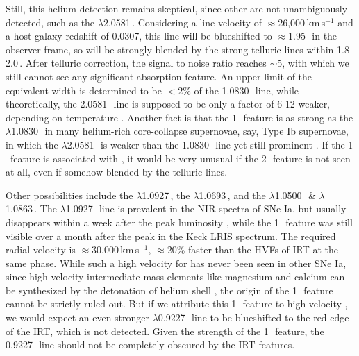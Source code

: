 \documentclass[twocolumn]{aastex631}
\begin{document}
Still, this helium detection remains skeptical, since other  are not unambiguously detected, such as the  $\lambda$2.0581\,\micron. Considering a line velocity of $\approx$26,000\,km\,s$^{-1}$ and a host galaxy redshift of 0.0307, this line will be blueshifted to $\approx$1.95\,\micron\ in the observer frame, so will be strongly blended by the strong telluric lines within 1.8-2.0\,\micron. After telluric correction, the signal to noise ratio reaches $\sim$5, with which we still cannot see any significant absorption feature. An upper limit of the equivalent width is determined to be $<2\%$ of the 1.0830\,\micron\ line, while theoretically, the 2.0581\,\micron\ line is supposed to be only a factor of 6-12 weaker, depending on temperature \citep{Marion2009_NIR}. Another fact is that the 1\,\micron\ feature is as strong as the  $\lambda$1.0830\,\micron\ in many helium-rich core-collapse supernovae, say, Type Ib supernovae, in which the  $\lambda$2.0581\,\micron\ is weaker than the 1.0830\,\micron\ line yet still prominent \citep{CSP_Ibc_2022}. If the 1\,\micron\ feature is associated with , it would be very unusual if the 2\,\micron\ feature is not seen at all, even if somehow blended by the telluric lines.

Other possibilities include the  $\lambda$1.0927\,\micron, the  $\lambda$1.0693\,\micron, and the  $\lambda$1.0500\,\micron\ \& $\lambda$1.0863\,\micron. The  $\lambda$1.0927\,\micron\ line is prevalent in the NIR spectra of SNe Ia, but usually disappears within a week after the peak luminosity \citep{Marion2009_NIR}, while the 1\,\micron\ feature was still visible over a month after the peak in the Keck LRIS spectrum. The required radial velocity is $\approx$30,000\,km\,s$^{-1}$, $\approx$20\% faster than the HVFs of  IRT at the same phase. While such a high velocity for  has never been seen in other SNe Ia, since high-velocity intermediate-mass elements like magnesium and calcium can be synthesized by the detonation of helium shell \citep{Shen_DD_2014}, the  origin of the 1\,\micron\ feature cannot be strictly ruled out. But if we attribute this 1\,\micron\ feature to high-velocity , we would expect an even stronger $\lambda$0.9227\,\micron\ line to be blueshifted to the red edge of the  IRT, which is not detected. Given the strength of the 1\,\micron\ feature, the 0.9227\,\micron\ line should not be completely obscured by the  IRT features. 
\end{document}
